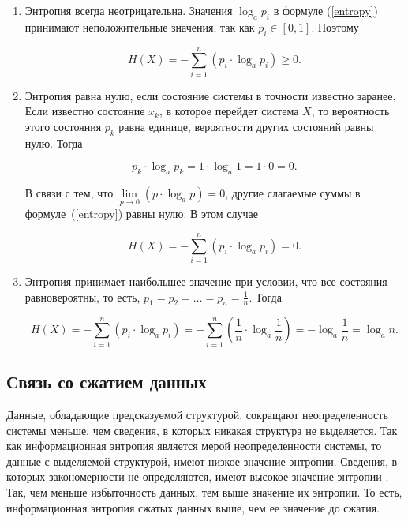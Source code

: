 \begin{enumerate}
	\item Энтропия всегда неотрицательна. Значения $\log_{a} p_{i}$ в формуле (\ref{entropy}) принимают неположительные значения, так как $p_{i} \in [0, 1]$. Поэтому
	
\begin{equation}
	H(X) = -\sum_{i = 1}^n (p_{i} \cdot \log_{a} p_{i}) \geqslant 0.
\end{equation}

	\item\label{property2} Энтропия равна нулю, если состояние системы в точности известно заранее. Если известно состояние $x_{k}$, в которое перейдет система $X$, то вероятность этого состояния $p_{k}$ равна единице, вероятности других состояний равны нулю. Тогда
	
\begin{equation}
	p_{k} \cdot \log_{a} p_{k} = 1 \cdot \log_{a} 1 = 1 \cdot 0 = 0.
\end{equation}

В связи с тем, что $\lim\limits_{p \to 0} (p \cdot \log_{a}p) = 0$, другие слагаемые суммы в формуле~(\ref{entropy}) равны нулю. В этом случае 

\begin{equation}
	H(X) = -\sum_{i = 1}^n (p_{i} \cdot \log_{a} p_{i}) = 0.
\end{equation}

	\item\label{property3} Энтропия принимает наибольшее значение при условии, что все состояния равновероятны, то есть, $p_{1} = p_{2} = \dots = p_{n} = \frac{1}{n}$. Тогда
	
\begin{equation}
	H(X) = -\sum_{i = 1}^n (p_{i} \cdot \log_{a} p_{i}) = -\sum_{i = 1}^n (\frac{1}{n} \cdot \log_{a} \frac{1}{n}) = -\log_{a} \frac{1}{n} = \log_{a} n.
\end{equation}
	
\end{enumerate}

\subsection{Связь со сжатием данных}\label{relation}

Данные, обладающие предсказуемой структурой, сокращают неопределенность системы меньше, чем сведения, в которых никакая структура не выделяется. Так как информационная энтропия является мерой неопределенности системы, то данные с выделяемой структурой, имеют низкое значение энтропии. Сведения, в которых закономерности не определяются, имеют высокое значение энтропии \cite{relation}. Так, чем меньше избыточность данных, тем выше значение их энтропии. То есть, информационная энтропия сжатых данных выше, чем ее значение до сжатия.

